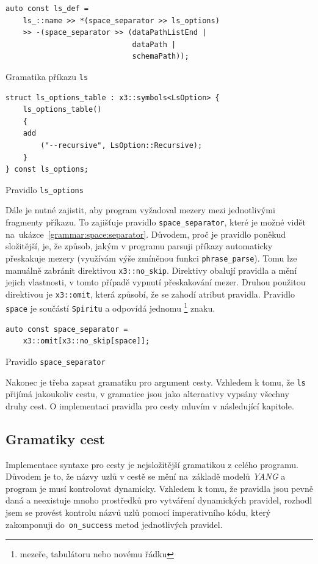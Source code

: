 \documentclass[thesis=B,czech,hidelinks]{FITthesis}[2019/03/06]
\begin{document}
\begin{listing}
\begin{verbatim}
auto const ls_def =
    ls_::name >> *(space_separator >> ls_options)
    >> -(space_separator >> (dataPathListEnd |
                             dataPath |
                             schemaPath));
\end{verbatim}
\caption{Gramatika příkazu \texttt{ls}}\label{grammar:ls}
\end{listing}


\begin{listing}
\begin{verbatim}
struct ls_options_table : x3::symbols<LsOption> {
    ls_options_table()
    {
    add
        ("--recursive", LsOption::Recursive);
    }
} const ls_options;
\end{verbatim}
\caption{Pravidlo \texttt{ls\_options}}\label{grammar:ls:options}
\end{listing}

Dále je nutné zajistit, aby program vyžadoval mezery mezi jednotlivými fragmenty příkazu. To zajišťuje pravidlo \verb¨space_separator¨, které je možné vidět na~ukázce~\ref{grammar:space:separator}. Důvodem, proč je pravidlo poněkud složitější, je, že způsob, jakým v programu parsuji příkazy automaticky přeskakuje mezery (využívám výše zmíněnou funkci \texttt{phrase\_parse}). Tomu lze manuálně zabránit direktivou \verb¨x3::no_skip¨. Direktivy obalují pravidla a mění jejich vlastnosti, v tomto případě vypnutí přeskakování mezer. Druhou použitou direktivou je \verb¨x3::omit¨, která způsobí, že se zahodí atribut pravidla. Pravidlo \texttt{space} je součástí \texttt{Spiritu} a odpovídá jednomu \footnote{mezeře, tabulátoru nebo novému řádku} znaku.

\begin{listing}
\begin{verbatim}
auto const space_separator =
    x3::omit[x3::no_skip[space]];
\end{verbatim}
\caption{Pravidlo \texttt{space\_separator}}\label{grammar:space:separator}
\end{listing}

Nakonec je třeba zapsat gramatiku pro argument cesty. Vzhledem k tomu, že \texttt{ls} přijímá jakoukoliv cestu, v gramatice jsou jako alternativy vypsány všechny druhy cest. O implementaci pravidla pro cesty mluvím v následující kapitole.

\subsection{Gramatiky cest}
Implementace syntaxe pro cesty je nejsložitější gramatikou z celého programu. Důvodem je to, že názvy uzlů v cestě se mění na~základě modelů \textit{YANG} a program je musí kontrolovat dynamicky. Vzhledem k tomu, že pravidla jsou pevně daná a neexistuje mnoho prostředků pro vytváření dynamických pravidel, rozhodl jsem se provést kontrolu názvů uzlů pomocí imperativního kódu, který zakomponuji do~\verb¨on_success¨ metod jednotlivých pravidel.
\end{document}
